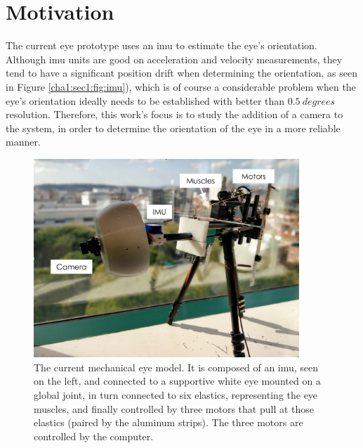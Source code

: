 \section{Motivation}
\label{cha1:motivation}

The current eye prototype uses an \acrfull{imu} to estimate the eye's orientation. Although \acrshort{imu} units are good on acceleration and velocity measurements, they tend to have a significant position drift when determining the orientation, as seen in Figure \ref{cha1:sec1:fig:imu}), which is of course a considerable problem when the eye's orientation ideally needs to be established with better than $0.5 \ degrees$ resolution. Therefore, this work's focus is to study the addition of a camera to the system, in order to determine the orientation of the eye in a more reliable manner. 

\begin{figure}[ht]
	\centering
	\includegraphics[width=10cm]{images/prototypenew.png}
	\caption[Current mechanical eye model]{The current mechanical eye model. It is composed of an  \acrshort{imu}, seen on the left, and connected to a supportive white eye mounted on a global joint, in turn connected to six elastics, representing the eye muscles, and finally controlled by three motors that pull at those elastics (paired by the aluminum strips). The three motors are controlled by the computer.}
	\label{cha1:sec1:fig:curr_eye_model}
\end{figure}

